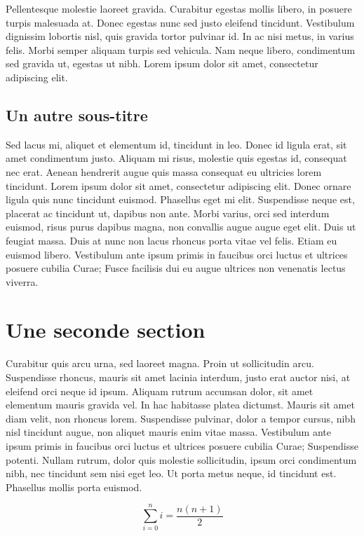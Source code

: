 Pellentesque molestie laoreet gravida. Curabitur egestas mollis libero, in
posuere turpis malesuada at. Donec egestas nunc sed justo eleifend
tincidunt. Vestibulum dignissim lobortis nisl, quis gravida tortor pulvinar
id. In ac nisi metus, in varius felis. Morbi semper aliquam turpis sed
vehicula. Nam neque libero, condimentum sed gravida ut, egestas ut nibh.
Lorem ipsum dolor sit amet, consectetur adipiscing elit.

\subsection{Un autre sous-titre}

Sed lacus mi, aliquet et elementum id, tincidunt in leo. Donec id ligula
erat, sit amet condimentum justo. Aliquam mi risus, molestie quis egestas
id, consequat nec erat. Aenean hendrerit augue quis massa consequat eu
ultricies lorem tincidunt. Lorem ipsum dolor sit amet, consectetur
adipiscing elit. Donec ornare ligula quis nunc tincidunt euismod. Phasellus
eget mi elit. Suspendisse neque est, placerat ac tincidunt ut, dapibus non
ante. Morbi varius, orci sed interdum euismod, risus purus dapibus magna,
non convallis augue augue eget elit. Duis ut feugiat massa. Duis at nunc non
lacus rhoncus porta vitae vel felis. Etiam eu euismod libero. Vestibulum
ante ipsum primis in faucibus orci luctus et ultrices posuere cubilia Curae;
Fusce facilisis dui eu augue ultrices non venenatis lectus viverra.

\section{Une seconde section}

Curabitur quis arcu urna, sed laoreet magna. Proin ut sollicitudin arcu.
Suspendisse rhoncus, mauris sit amet lacinia interdum, justo erat auctor
nisi, at eleifend orci neque id ipsum. Aliquam rutrum accumsan dolor, sit
amet elementum mauris gravida vel. In hac habitasse platea dictumst. Mauris
sit amet diam velit, non rhoncus lorem. Suspendisse pulvinar, dolor a tempor
cursus, nibh nisl tincidunt augue, non aliquet mauris enim vitae massa.
Vestibulum ante ipsum primis in faucibus orci luctus et ultrices posuere
cubilia Curae; Suspendisse potenti. Nullam rutrum, dolor quis molestie
sollicitudin, ipsum orci condimentum nibh, nec tincidunt sem nisi eget leo.
Ut porta metus neque, id tincidunt est. Phasellus mollis porta euismod.

\[
  \sum_{i=0}^n i = \frac{n(n+1)}{2}
\]

